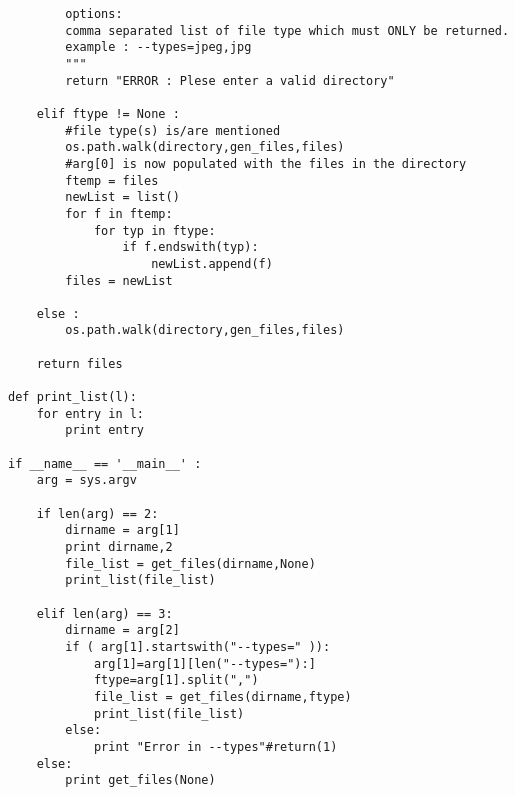 \documentclass[10pt,a4paper]{article}
\begin{document}
\begin{lstlisting}
        options:
        comma separated list of file type which must ONLY be returned.
        example : --types=jpeg,jpg
        """
        return "ERROR : Plese enter a valid directory"

    elif ftype != None :
        #file type(s) is/are mentioned        
        os.path.walk(directory,gen_files,files)
        #arg[0] is now populated with the files in the directory
        ftemp = files
        newList = list()
        for f in ftemp:
            for typ in ftype:
                if f.endswith(typ):
                    newList.append(f)
        files = newList

    else :
        os.path.walk(directory,gen_files,files)
        
    return files

def print_list(l):
    for entry in l:
        print entry

if __name__ == '__main__' :
    arg = sys.argv

    if len(arg) == 2:
        dirname = arg[1]
        print dirname,2
        file_list = get_files(dirname,None)
        print_list(file_list)

    elif len(arg) == 3:
        dirname = arg[2]
        if ( arg[1].startswith("--types=" )):
            arg[1]=arg[1][len("--types="):]
            ftype=arg[1].split(",")            
            file_list = get_files(dirname,ftype)
            print_list(file_list)
        else:
            print "Error in --types"#return(1)
    else:
        print get_files(None)

\end{lstlisting}

\newpage
\end{document}
